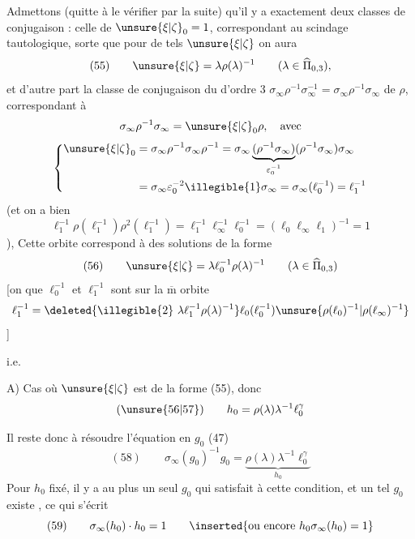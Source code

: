 Admettons (quitte à le vérifier par la suite) qu'il y a exactement deux classes de conjugaison : celle de $\unsure{\xi|\zeta}_0=1$, correspondant au scindage tautologique,  sorte que pour de tels $\unsure{\xi|\zeta}$ on aura
\[
(55)\qquad \unsure{\xi|\zeta}=\lambda\rho(\lambda)^{-1}
\qquad(\lambda\in\widehat{\Pi}_{0,3}),
\]
et d'autre part la classe de conjugaison du  d'ordre 3 $\sigma_\infty\rho^{-1}\sigma_\infty^{-1}=\sigma_\infty\rho^{-1}\sigma_\infty$ de $\rho$, correspondant à
\[
\sigma_\infty\rho^{-1}\sigma_\infty=\unsure{\xi|\zeta}_0\rho,\quad\text{avec}
\]
\[
\left\{\begin{aligned}
\unsure{\xi|\zeta}_0&=\sigma_\infty\rho^{-1}\sigma_\infty\rho^{-1}
=\sigma_\infty\underbrace{(\rho^{-1}\sigma_\infty)}_{\varepsilon_0^{-1}}(\rho^{-1}\sigma_\infty)\sigma_\infty\\
&=\sigma_\infty\varepsilon_0^{-2}\illegible{1}\sigma_\infty
=\sigma_\infty(\ell_0^{-1})=\ell_1^{-1}
\end{aligned}\right.
\]
(et on a bien
\[
\ell_1^{-1}\rho(\ell_1^{-1})\rho^2(\ell_1^{-1})
=\ell_1^{-1}\ell_\infty^{-1}\ell_0^{-1}
=(\ell_0\ell_\infty\ell_1)^{-1}=1
\]
), Cette orbite correspond à des solutions de la forme 
\[
(56)\qquad \unsure{\xi|\zeta}=\lambda\ell_0^{-1}\rho(\lambda)^{-1}
\qquad(\lambda\in\widehat{\Pi}_{0,3})
\]
[on  que $\ell_0^{-1}$ et $\ell_1^{-1}$ sont sur la $\overline{\mathrm m}$ orbite
\[
\ell_1^{-1}=\deleted{\illegible{2}\ \lambda\ell_1^{-1}\rho(\lambda)^{-1}}
\ell_0(\ell_0^{-1})\unsure{\rho(\ell_0)^{-1}|\rho(\ell_\infty)^{-1}}
\]
]

i.e. 


A) Cas  où $\unsure{\xi|\zeta}$ est de la forme (55), donc
\[
(\unsure{56|57})\qquad h_0=\rho(\lambda)\lambda^{-1}\ell_0^\gamma
\]


Il reste donc à résoudre l'équation en $g_0$ (47)
\[
(58)\qquad
\sigma_\infty(g_0)^{-1}g_0
=\underbrace{\rho(\lambda)\lambda^{-1}\ell_0^\gamma}_{h_0}
\]
Pour  $h_0$ fixé, il y a au plus un seul $g_0$ qui satisfait à cette condition, et un tel $g_0$ existe  , ce qui s'écrit
\[
(59)\qquad \sigma_\infty(h_0)\cdot h_0=1
\qquad\inserted{\text{ou encore }h_0\sigma_\infty(h_0)=1}
\]

